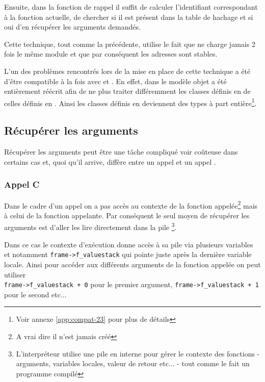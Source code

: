 Ensuite, dans la fonction de rappel il suffit de calculer l'identifiant correspondant à la fonction actuelle, de chercher si il est présent dans la table de hachage et si oui d'en récupérer les arguments demandés.

\begin{note}
Cette technique, tout comme la précédente, utilise le fait que \Python ne charge jamais 2 fois le même module et que par conséquent les adresses sont stables.
\end{note}

\begin{note}
L'un des problèmes rencontrés lors de la mise en place de cette technique a été d'être compatible à la fois avec  et . En effet, dans  le modèle objet a été entièrement réécrit afin de ne plus traiter différemment les classes définis en \C de celles définis en \Python. Ainsi les classes définis en \Python deviennent des types à part entière\footnote{Voir annexe \vref{app:compat-23} pour plus de détails}.
\end{note}

\subsection{Récupérer les arguments}
Récupérer les arguments peut être une tâche compliqué voir coûteuse dans certains cas et, quoi qu'il arrive, diffère entre un appel \C et un appel \Python.

\subsubsection*{Appel C}
Dans le cadre d'un appel \C on a pas accès au contexte de la fonction appelée\footnote{A vrai dire il n'est jamais créé} mais à celui de la fonction appelante. Par conséquent le seul moyen de récupérer les arguments est d'aller les lire directement dans la pile \Python\footnote{L'interpréteur \Python utilise une pile en interne pour gérer le contexte des fonctions - arguments, variables locales, valeur de retour etc... - tout comme le fait un programme \C compilé}.

Dans ce cas le contexte d'exécution donne accès à sa pile via plusieurs variables et notamment \verb|frame->f_valuestack| qui pointe juste après la dernière variable locale. Ainsi pour accéder aux différents arguments de la fonction \C appelée on peut utiliser\\ \verb|frame->f_valuestack + 0| pour le premier argument, \verb|frame->f_valuestack + 1| pour le second etc...

